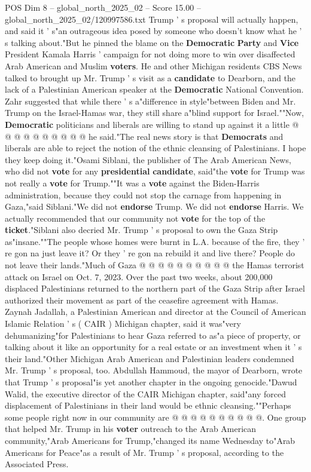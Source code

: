 \begin{textsample}{POS Dim 8 – global\_north\_2025\_02 – Score 15.00 – global\_north\_2025\_02/120997586.txt}
Trump ' s proposal will actually happen, and said it ' s"an outrageous idea posed by someone who doesn't know what he ' s talking about."But he pinned the blame on the \textbf{Democratic} \textbf{Party} and \textbf{Vice} President Kamala Harris ' campaign for not doing more to win over disaffected Arab American and Muslim \textbf{voters}.
He and other Michigan residents CBS News talked to brought up Mr.
Trump ' s visit as a \textbf{candidate} to Dearborn, and the lack of a Palestinian American speaker at the \textbf{Democratic} National Convention.
Zahr suggested that while there ' s a"difference in style"between Biden and Mr.
Trump on the Israel-Hamas war, they still share a"blind support for Israel.""Now, \textbf{Democratic} politicians and liberals are willing to stand up against it a little @ @ @ @ @ @ @ @ @ @ he said."The real news story is that \textbf{Democrats} and liberals are able to reject the notion of the ethnic cleansing of Palestinians.
I hope they keep doing it."Osami Siblani, the publisher of The Arab American News, who did not \textbf{vote} for any \textbf{presidential} \textbf{candidate}, said"the \textbf{vote} for Trump was not really a \textbf{vote} for Trump.""It was a \textbf{vote} against the Biden-Harris administration, because they could not stop the carnage from happening in Gaza,"said Siblani."We did not \textbf{endorse} Trump.
We did not \textbf{endorse} Harris.
We actually recommended that our community not \textbf{vote} for the top of the \textbf{ticket}."Siblani also decried Mr.
Trump ' s proposal to own the Gaza Strip as"insane.""The people whose homes were burnt in L.A. because of the fire, they ' re gon na just leave it?
Or they ' re gon na rebuild it and live there?
People do not leave their lands."Much of Gaza @ @ @ @ @ @ @ @ @ @ the Hamas terrorist attack on Israel on Oct. 7, 2023.
Over the past two weeks, about 200,000 displaced Palestinians returned to the northern part of the Gaza Strip after Israel authorized their movement as part of the ceasefire agreement with Hamas.
Zaynah Jadallah, a Palestinian American and director at the Council of American Islamic Relation ' s ( CAIR ) Michigan chapter, said it was"very dehumanizing"for Palestinians to hear Gaza referred to as"a piece of property, or talking about it like an opportunity for a real estate or an investment when it ' s their land."Other Michigan Arab American and Palestinian leaders condemned Mr.
Trump ' s proposal, too.
Abdullah Hammoud, the mayor of Dearborn, wrote that Trump ' s proposal"is yet another chapter in the ongoing genocide."Dawud Walid, the executive director of the CAIR Michigan chapter, said"any forced displacement of Palestinians in their land would be ethnic cleansing.""Perhaps some people right now in our community are @ @ @ @ @ @ @ @ @ @.
One group that helped Mr.
Trump in his \textbf{voter} outreach to the Arab American community,"Arab Americans for Trump,"changed its name Wednesday to"Arab Americans for Peace"as a result of Mr.
Trump ' s proposal, according to the Associated Press.

\end{textsample}
